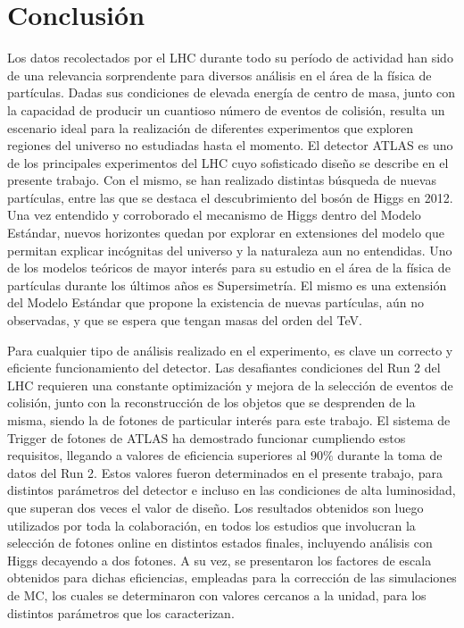 \chapter{Conclusión}

Los datos recolectados por el LHC durante todo su período de actividad han sido de una relevancia sorprendente para diversos análisis en el área de la física de partículas. Dadas sus condiciones de elevada energía de centro de masa, junto con la capacidad de producir un cuantioso número de eventos de colisión, resulta un escenario ideal para la realización de diferentes experimentos que exploren regiones del universo no estudiadas hasta el momento. El detector ATLAS es uno de los principales experimentos del LHC cuyo sofisticado diseño se describe en el presente trabajo. Con el mismo, se han realizado distintas búsqueda de nuevas partículas, entre las que se destaca el descubrimiento del bosón de Higgs en 2012. Una vez entendido y corroborado el mecanismo de Higgs dentro del Modelo Estándar, nuevos horizontes quedan por explorar en extensiones del modelo que permitan explicar incógnitas del universo y la naturaleza aun no entendidas. Uno de los modelos teóricos de mayor interés para su estudio en el área de la física de partículas durante los últimos años es Supersimetría. El mismo es una extensión del Modelo Estándar que propone la existencia de nuevas partículas, aún no observadas, y que se espera que tengan masas del orden del TeV. 


Para cualquier tipo de análisis realizado en el experimento, es clave un correcto y eficiente funcionamiento del detector. Las desafiantes condiciones del Run 2 del LHC requieren una constante optimización y mejora de la selección de eventos de colisión, junto con la reconstrucción de los objetos que se desprenden de la misma, siendo la de fotones de particular interés para este trabajo.
El sistema de Trigger de fotones de ATLAS ha demostrado funcionar cumpliendo estos requisitos, llegando a valores de eficiencia superiores al $90\%$ durante la toma de datos del Run 2. Estos valores fueron determinados en el presente trabajo, para distintos parámetros del detector e incluso en las condiciones de alta luminosidad, que superan dos veces el valor de diseño. Los resultados obtenidos son luego utilizados por toda la colaboración, en todos los estudios que involucran la selección de fotones online en distintos estados finales, incluyendo análisis con Higgs decayendo a dos fotones. A su vez, se presentaron los factores de escala obtenidos para dichas eficiencias, empleadas para la corrección de las simulaciones de MC, los cuales se determinaron con valores cercanos a la unidad, para los distintos parámetros que los caracterizan.

